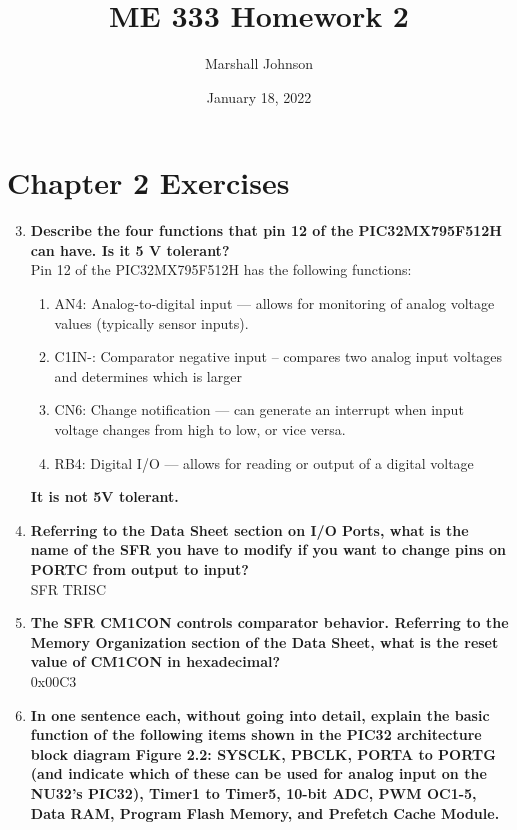 \documentclass{article}
\title{ME 333 Homework 2}
\author{Marshall Johnson}
\date{January 18, 2022}
\begin{document}
\maketitle

\section*{Chapter 2 Exercises}

\begin{enumerate}[label=\textbf{\arabic*})]
    \setcounter{enumi}{2}
    \item \textbf{Describe the four functions that pin 12 of the PIC32MX795F512H can have. Is it 5 V tolerant?} \\
    
    Pin 12 of the PIC32MX795F512H has the following functions:
    \begin{enumerate}[label=\textbf{\alph*}.]
        \item AN4: Analog-to-digital input --- allows for monitoring of 
        analog voltage values (typically sensor inputs).
        \item C1IN-: Comparator negative input -- compares two analog input voltages
        and determines which is larger
        \item CN6: Change notification --- can generate an interrupt when input 
        voltage changes from high to low, or vice versa.
        \item RB4: Digital I/O --- allows for reading or output of a digital voltage
    \end{enumerate}

    \textbf{It is not 5V tolerant.}

    \item \textbf{Referring to the Data Sheet section on I/O Ports, what is the name of the SFR you have
    to modify if you want to change pins on PORTC from output to input?} \\

    SFR TRISC

    \item \textbf{The SFR CM1CON controls comparator behavior. Referring to the Memory
    Organization section of the Data Sheet, what is the reset value of CM1CON in
    hexadecimal?} \\

    0x00C3

    \pagebreak
    \item \textbf{In one sentence each, without going into detail, explain the basic function of the
    following items shown in the PIC32 architecture block diagram Figure 2.2: SYSCLK,
    PBCLK, PORTA to PORTG (and indicate which of these can be used for analog input on
    the NU32’s PIC32), Timer1 to Timer5, 10-bit ADC, PWM OC1-5, Data RAM, Program Flash Memory, 
    and Prefetch Cache Module.} \\


\end{enumerate}
\end{document}
